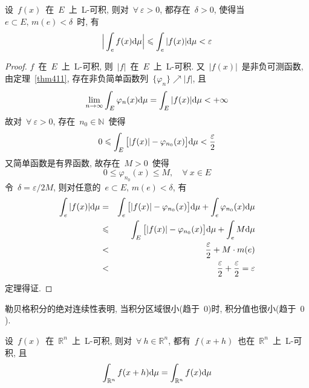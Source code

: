 \begin{theorem}
设~$f(x)$~在~$E$~上~L-可积, 则对~$\forall~\varepsilon > 0$, 都存在~$\delta > 0$, 使得当~$e \subset E, \, m(e) < \delta$~时, 有
\[
\Big| \int_e f(x) \mathrm{d} \mu \Big| \leqslant \int_e |f(x)| \mathrm{d} \mu < \varepsilon
\]
\end{theorem}

\begin{proof}
$f$~在~$E$~上~L-可积, 则~$|f|$~在~$E$~上~L-可积. 又~$|f(x)|$~是非负可测函数, 由定理~\ref{thm411},  存在非负简单函数列~$\{\varphi_n\} \nearrow |f|$, 且
\[
\lim_{n \to \infty} \int_E \varphi_n(x) \mathrm{d} \mu = \int_E |f(x)| \mathrm{d} \mu < +\infty
\]
故对~$\forall~\varepsilon > 0$, 存在~$n_0 \in \mathbb{N}$~使得
\[
0 \leqslant \int_E \big[ |f(x)| - \varphi_{n_0}(x) \big] \mathrm{d} \mu < \frac{\varepsilon}{2}
\]
又简单函数是有界函数, 故存在~$M > 0$~使得
\[
0 \leqslant \varphi_{n_0}(x) \leqslant M, \quad  \forall~x \in E
\]
令~$\delta = \varepsilon/2M$, 则对任意的~$e \subset E, \, m(e) < \delta$, 有
\begin{eqnarray*}
\int_e |f(x)| \mathrm{d} \mu &=& \int_e \big[ |f(x)| - \varphi_{n_0}(x) \big] \mathrm{d} \mu + \int_e \varphi_{n_0}(x) \mathrm{d} \mu \\
&\leqslant& \int_E \big[ |f(x)| - \varphi_{n_0}(x) \big] \mathrm{d} \mu + \int_e M \mathrm{d} \mu \\
&<& \frac{\varepsilon}{2} + M \cdot m(e) \\
&<& \frac{\varepsilon}{2} + \frac{\varepsilon}{2} = \varepsilon
\end{eqnarray*}
定理得证.
\end{proof}

勒贝格积分的绝对连续性表明, 当积分区域很小(趋于~$0$)时, 积分值也很小(趋于~$0$).

\begin{theorem}[积分变量的平移变换] \label{thm427}
设~$f(x)$~在~$\mathbb{R}^n$~上~L-可积, 则对~$\forall~h \in \mathbb{R}^n$,   都有~$f(x + h)$~也在~$\mathbb{R}^n$~上~L-可积, 且
\[
\int_{\mathbb{R}^n} f(x + h) \mathrm{d} \mu = \int_{\mathbb{R}^n} f(x) \mathrm{d} \mu
\]
\end{theorem}

